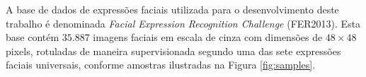 A base de dados de expressões faciais utilizada para o desenvolvimento deste trabalho é denominada \emph{Facial Expression Recognition Challenge} (FER2013). Esta base contém $35.887$ imagens faciais em escala de cinza com dimensões de $48\times 48$ pixels, rotuladas de maneira supervisionada segundo uma das sete expressões faciais universais, conforme amostras ilustradas na Figura \ref{fig:samples}.

\begin{figure}[h!]
	\centering
  \label{fig:samples}

  \begin{subfigure}
  \end{subfigure}
\end{figure}

